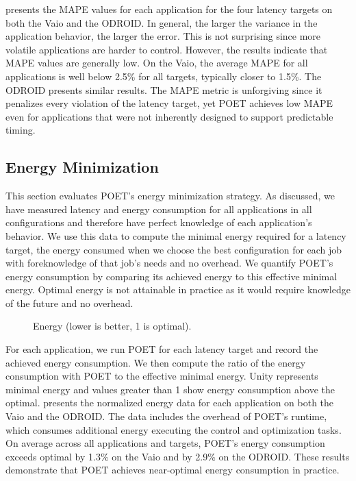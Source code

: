  presents the MAPE values for each application for the four latency targets on both the Vaio and the ODROID.
In general, the larger the variance in the application behavior, the larger the error.
This is not surprising since more volatile applications are harder to control.
However, the results indicate that MAPE values are generally low.
On the Vaio, the average MAPE for all applications is well below 2.5\% for all targets, typically closer to 1.5\%.
The ODROID presents similar results.
The MAPE metric is unforgiving since it penalizes every violation of the latency target, yet POET achieves low MAPE even for applications that were not inherently designed to support predictable timing.


\subsection{Energy Minimization}
\label{sec:poet-eval-energy}

This section evaluates POET's energy minimization strategy.
As discussed, we have measured latency and energy consumption for all applications in all configurations and therefore have perfect knowledge of each application's behavior.
We use this data to compute the minimal energy required for a latency target, \ie the energy consumed when we choose the best configuration for each job with foreknowledge of that job's needs and no overhead.
We quantify POET's energy consumption by comparing its achieved energy to this effective minimal energy.
Optimal energy is not attainable in practice as it would require knowledge of the future and no overhead.

\begin{figure}[t]
  \centering
    
  \caption{Energy (lower is better, 1 is optimal).}
  \label{fig:poet-ee}
\end{figure}

For each application, we run POET for each latency target and record the achieved energy consumption.
We then compute the ratio of the energy consumption with POET to the effective minimal energy.
Unity represents minimal energy and values greater than 1 show energy consumption above the optimal.
 presents the normalized energy data for each application on both the Vaio and the ODROID.
The data includes the overhead of POET's runtime, which consumes additional energy executing the control and optimization tasks.
On average across all applications and targets, POET's energy consumption exceeds optimal by 1.3\% on the Vaio and by 2.9\% on the ODROID.
These results demonstrate that POET achieves near-optimal energy consumption in practice.


